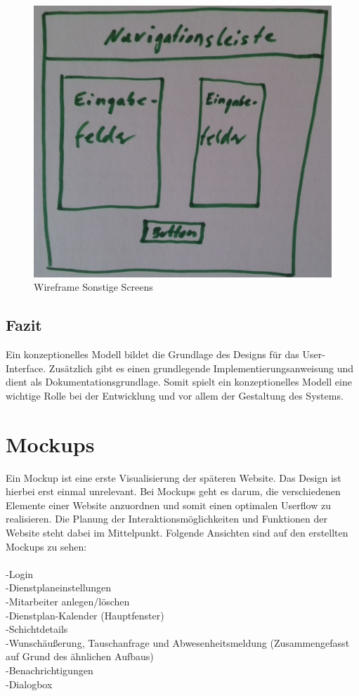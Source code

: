 \documentclass[11pt,
paper=a4,
bibtotocnumbered,	  %
liststotocnumbered,  %
DIV=calc,		  %
tablecaptionabove,	  %
headinclude,
]{article}
\begin{document}
\begin{figure}[H]
\includegraphics[scale=1]{Bilder/Wireframe2.jpg}
\caption{Wireframe Sonstige Screens}
\end{figure}
\subsection{Fazit}
Ein konzeptionelles Modell bildet die Grundlage des Designs für das User-Interface. Zusätzlich gibt es einen grundlegende Implementierungsanweisung und dient als Dokumentationsgrundlage. Somit spielt ein konzeptionelles Modell eine wichtige Rolle bei der Entwicklung und vor allem der Gestaltung des Systems.
\section{Mockups}
Ein Mockup ist eine erste Visualisierung der späteren Website. Das Design ist hierbei erst einmal unrelevant. Bei Mockups geht es darum, die verschiedenen Elemente einer Website anzuordnen und somit einen optimalen Userflow zu realisieren. Die Planung der Interaktionsmöglichkeiten und Funktionen der Website steht dabei im Mittelpunkt.
Folgende Ansichten sind auf den erstellten Mockups zu sehen: \\\\
-Login\\
-Dienstplaneinstellungen\\
-Mitarbeiter anlegen/löschen\\
-Dienstplan-Kalender (Hauptfenster)\\
-Schichtdetails\\
-Wunschäußerung, Tauschanfrage und Abwesenheitsmeldung (Zusammengefasst auf Grund des ähnlichen Aufbaus)\\
-Benachrichtigungen\\
-Dialogbox\\
\end{document}
